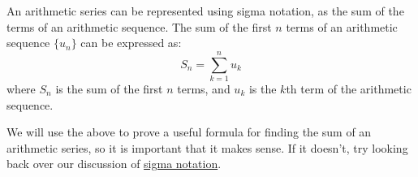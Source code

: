 \begin{remark}
	An arithmetic series can be represented using sigma notation, as the sum of the terms of an arithmetic sequence. 
	The sum of the first $n$ terms of an arithmetic sequence $\{u_n\}$ can be expressed as:
	\begin{equation*}
		S_n = \sum_{k=1}^{n} u_k
	\end{equation*}
	where $S_n$ is the sum of the first $n$ terms, and $u_k$ is the $k$th term of the arithmetic sequence.
\end{remark}

We will use the above to prove a useful formula for finding the sum of an arithmetic series, so it is important
that it makes sense. If it doesn't, try looking back over our discussion of \hyperref[sec:sigma-notation]{sigma notation}.


